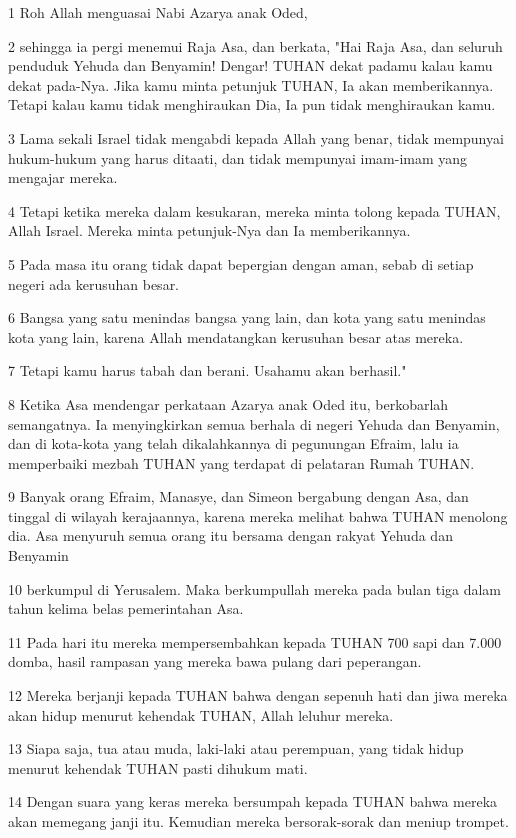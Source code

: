 \par 1 Roh Allah menguasai Nabi Azarya anak Oded,
\par 2 sehingga ia pergi menemui Raja Asa, dan berkata, "Hai Raja Asa, dan seluruh penduduk Yehuda dan Benyamin! Dengar! TUHAN dekat padamu kalau kamu dekat pada-Nya. Jika kamu minta petunjuk TUHAN, Ia akan memberikannya. Tetapi kalau kamu tidak menghiraukan Dia, Ia pun tidak menghiraukan kamu.
\par 3 Lama sekali Israel tidak mengabdi kepada Allah yang benar, tidak mempunyai hukum-hukum yang harus ditaati, dan tidak mempunyai imam-imam yang mengajar mereka.
\par 4 Tetapi ketika mereka dalam kesukaran, mereka minta tolong kepada TUHAN, Allah Israel. Mereka minta petunjuk-Nya dan Ia memberikannya.
\par 5 Pada masa itu orang tidak dapat bepergian dengan aman, sebab di setiap negeri ada kerusuhan besar.
\par 6 Bangsa yang satu menindas bangsa yang lain, dan kota yang satu menindas kota yang lain, karena Allah mendatangkan kerusuhan besar atas mereka.
\par 7 Tetapi kamu harus tabah dan berani. Usahamu akan berhasil."
\par 8 Ketika Asa mendengar perkataan Azarya anak Oded itu, berkobarlah semangatnya. Ia menyingkirkan semua berhala di negeri Yehuda dan Benyamin, dan di kota-kota yang telah dikalahkannya di pegunungan Efraim, lalu ia memperbaiki mezbah TUHAN yang terdapat di pelataran Rumah TUHAN.
\par 9 Banyak orang Efraim, Manasye, dan Simeon bergabung dengan Asa, dan tinggal di wilayah kerajaannya, karena mereka melihat bahwa TUHAN menolong dia. Asa menyuruh semua orang itu bersama dengan rakyat Yehuda dan Benyamin
\par 10 berkumpul di Yerusalem. Maka berkumpullah mereka pada bulan tiga dalam tahun kelima belas pemerintahan Asa.
\par 11 Pada hari itu mereka mempersembahkan kepada TUHAN 700 sapi dan 7.000 domba, hasil rampasan yang mereka bawa pulang dari peperangan.
\par 12 Mereka berjanji kepada TUHAN bahwa dengan sepenuh hati dan jiwa mereka akan hidup menurut kehendak TUHAN, Allah leluhur mereka.
\par 13 Siapa saja, tua atau muda, laki-laki atau perempuan, yang tidak hidup menurut kehendak TUHAN pasti dihukum mati.
\par 14 Dengan suara yang keras mereka bersumpah kepada TUHAN bahwa mereka akan memegang janji itu. Kemudian mereka bersorak-sorak dan meniup trompet.
